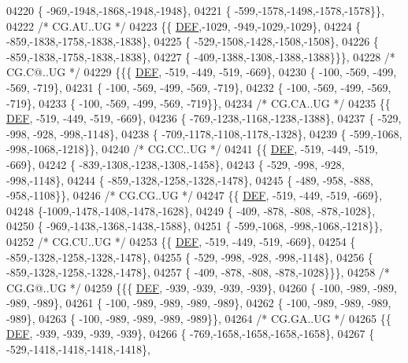\begin{DoxyCode}
04220 \{ -969,-1948,-1868,-1948,-1948\},
04221 \{ -599,-1578,-1498,-1578,-1578\}\},
04222 \textcolor{comment}{/* CG.AU..UG */}
04223 \{\{  \mbox{\hyperlink{1_88_84__epars_8h_a397419fc12b37ed479c8abb9d444d843}{DEF}},-1029, -949,-1029,-1029\},
04224 \{ -859,-1838,-1758,-1838,-1838\},
04225 \{ -529,-1508,-1428,-1508,-1508\},
04226 \{ -859,-1838,-1758,-1838,-1838\},
04227 \{ -409,-1388,-1308,-1388,-1388\}\}\},
04228 \textcolor{comment}{/* CG.C@..UG */}
04229 \{\{\{  \mbox{\hyperlink{1_88_84__epars_8h_a397419fc12b37ed479c8abb9d444d843}{DEF}}, -519, -449, -519, -669\},
04230 \{ -100, -569, -499, -569, -719\},
04231 \{ -100, -569, -499, -569, -719\},
04232 \{ -100, -569, -499, -569, -719\},
04233 \{ -100, -569, -499, -569, -719\}\},
04234 \textcolor{comment}{/* CG.CA..UG */}
04235 \{\{  \mbox{\hyperlink{1_88_84__epars_8h_a397419fc12b37ed479c8abb9d444d843}{DEF}}, -519, -449, -519, -669\},
04236 \{ -769,-1238,-1168,-1238,-1388\},
04237 \{ -529, -998, -928, -998,-1148\},
04238 \{ -709,-1178,-1108,-1178,-1328\},
04239 \{ -599,-1068, -998,-1068,-1218\}\},
04240 \textcolor{comment}{/* CG.CC..UG */}
04241 \{\{  \mbox{\hyperlink{1_88_84__epars_8h_a397419fc12b37ed479c8abb9d444d843}{DEF}}, -519, -449, -519, -669\},
04242 \{ -839,-1308,-1238,-1308,-1458\},
04243 \{ -529, -998, -928, -998,-1148\},
04244 \{ -859,-1328,-1258,-1328,-1478\},
04245 \{ -489, -958, -888, -958,-1108\}\},
04246 \textcolor{comment}{/* CG.CG..UG */}
04247 \{\{  \mbox{\hyperlink{1_88_84__epars_8h_a397419fc12b37ed479c8abb9d444d843}{DEF}}, -519, -449, -519, -669\},
04248 \{-1009,-1478,-1408,-1478,-1628\},
04249 \{ -409, -878, -808, -878,-1028\},
04250 \{ -969,-1438,-1368,-1438,-1588\},
04251 \{ -599,-1068, -998,-1068,-1218\}\},
04252 \textcolor{comment}{/* CG.CU..UG */}
04253 \{\{  \mbox{\hyperlink{1_88_84__epars_8h_a397419fc12b37ed479c8abb9d444d843}{DEF}}, -519, -449, -519, -669\},
04254 \{ -859,-1328,-1258,-1328,-1478\},
04255 \{ -529, -998, -928, -998,-1148\},
04256 \{ -859,-1328,-1258,-1328,-1478\},
04257 \{ -409, -878, -808, -878,-1028\}\}\},
04258 \textcolor{comment}{/* CG.G@..UG */}
04259 \{\{\{  \mbox{\hyperlink{1_88_84__epars_8h_a397419fc12b37ed479c8abb9d444d843}{DEF}}, -939, -939, -939, -939\},
04260 \{ -100, -989, -989, -989, -989\},
04261 \{ -100, -989, -989, -989, -989\},
04262 \{ -100, -989, -989, -989, -989\},
04263 \{ -100, -989, -989, -989, -989\}\},
04264 \textcolor{comment}{/* CG.GA..UG */}
04265 \{\{  \mbox{\hyperlink{1_88_84__epars_8h_a397419fc12b37ed479c8abb9d444d843}{DEF}}, -939, -939, -939, -939\},
04266 \{ -769,-1658,-1658,-1658,-1658\},
04267 \{ -529,-1418,-1418,-1418,-1418\},

\end{DoxyCode}
